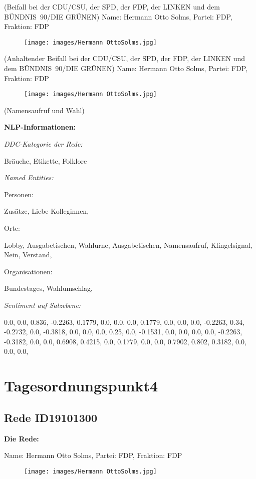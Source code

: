 \documentclass[10pt, a4paper]{report}
\begin{document}
(Beifall bei der CDU/CSU, der SPD, der FDP, der LINKEN und dem BÜNDNIS 90/DIE GRÜNEN)
Name: Hermann Otto Solms, Partei: FDP, Fraktion: FDP

\begin{figure}[!ht]
\texttt{[image: images/Hermann OttoSolms.jpg]}
\end{figure}


(Anhaltender Beifall bei der CDU/CSU, der SPD, der FDP, der LINKEN und dem BÜNDNIS 90/DIE GRÜNEN)
Name: Hermann Otto Solms, Partei: FDP, Fraktion: FDP

\begin{figure}[!ht]
\texttt{[image: images/Hermann OttoSolms.jpg]}
\end{figure}


(Namensaufruf und Wahl)


\textbf{NLP-Informationen:}

\textit{DDC-Kategorie der Rede:}

Bräuche, Etikette, Folklore

\textit{Named Entities:}

Personen:

Zusätze, Liebe Kolleginnen, 

Orte:

Lobby, Ausgabetischen, Wahlurne, Ausgabetischen, Namensaufruf, Klingelsignal, Nein, Verstand, 

Organisationen:

Bundestages, Wahlumschlag, 

\textit{Sentiment auf Satzebene:}

0.0, 0.0, 0.836, -0.2263, 0.1779, 0.0, 0.0, 0.0, 0.1779, 0.0, 0.0, 0.0, -0.2263, 0.34, -0.2732, 0.0, -0.3818, 0.0, 0.0, 0.0, 0.25, 0.0, -0.1531, 0.0, 0.0, 0.0, 0.0, -0.2263, -0.3182, 0.0, 0.0, 0.6908, 0.4215, 0.0, 0.1779, 0.0, 0.0, 0.7902, 0.802, 0.3182, 0.0, 0.0, 0.0, 
\section{Tagesordnungspunkt4}
\subsection{Rede ID19101300}

\textbf{Die Rede:}

Name: Hermann Otto Solms, Partei: FDP, Fraktion: FDP

\begin{figure}[!ht]
\texttt{[image: images/Hermann OttoSolms.jpg]}
\end{figure}
\end{document}
